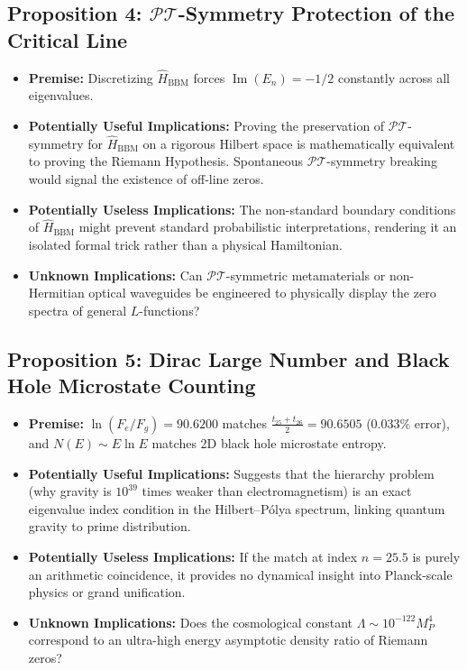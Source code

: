 \documentclass[11pt,a4paper]{article}
\begin{document}
\subsection{Proposition 4: \texorpdfstring{$\mathcal{PT}$}{PT}-Symmetry Protection of the Critical Line}
\begin{itemize}
    \item \textbf{Premise:} Discretizing $\hat{H}_{\text{BBM}}$ forces $\operatorname{Im}(E_n) = -1/2$ constantly across all eigenvalues.
    \item \textbf{Potentially Useful Implications:} Proving the preservation of $\mathcal{PT}$-symmetry for $\hat{H}_{\text{BBM}}$ on a rigorous Hilbert space is mathematically equivalent to proving the Riemann Hypothesis. Spontaneous $\mathcal{PT}$-symmetry breaking would signal the existence of off-line zeros.
    \item \textbf{Potentially Useless Implications:} The non-standard boundary conditions of $\hat{H}_{\text{BBM}}$ might prevent standard probabilistic interpretations, rendering it an isolated formal trick rather than a physical Hamiltonian.
    \item \textbf{Unknown Implications:} Can $\mathcal{PT}$-symmetric metamaterials or non-Hermitian optical waveguides be engineered to physically display the zero spectra of general $L$-functions?
\end{itemize}

\subsection{Proposition 5: Dirac Large Number and Black Hole Microstate Counting}
\begin{itemize}
    \item \textbf{Premise:} $\ln(F_e/F_g) = 90.6200$ matches $\frac{t_{25}+t_{26}}{2} = 90.6505$ ($0.033\%$ error), and $N(E) \sim E \ln E$ matches 2D black hole microstate entropy.
    \item \textbf{Potentially Useful Implications:} Suggests that the hierarchy problem (why gravity is $10^{39}$ times weaker than electromagnetism) is an exact eigenvalue index condition in the Hilbert--P\'olya spectrum, linking quantum gravity to prime distribution.
    \item \textbf{Potentially Useless Implications:} If the match at index $n=25.5$ is purely an arithmetic coincidence, it provides no dynamical insight into Planck-scale physics or grand unification.
    \item \textbf{Unknown Implications:} Does the cosmological constant $\Lambda \sim 10^{-122} M_P^4$ correspond to an ultra-high energy asymptotic density ratio of Riemann zeros?
\end{itemize}
\end{document}
